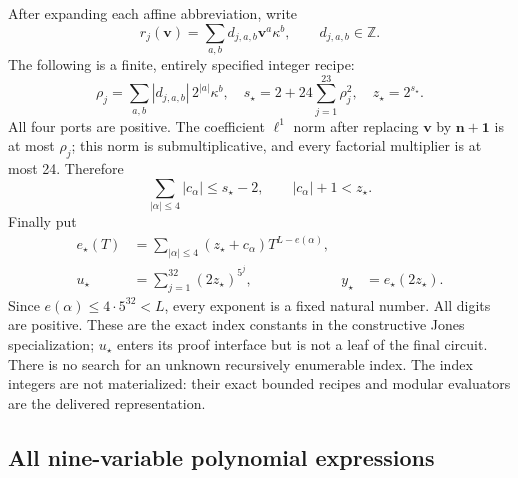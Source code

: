 After expanding each affine abbreviation, write
\[
 r_j(\mathbf v)=\sum_{a,b}d_{j,a,b}\mathbf v^a\kappa^b,
 \qquad d_{j,a,b}\in\mathbb Z.
\]
The following is a finite, entirely specified integer recipe:
\[
 \rho_j=\sum_{a,b}|d_{j,a,b}|\,2^{|a|}\kappa^b,
 \quad s_\star=2+24\sum_{j=1}^{23}\rho_j^2,
 \quad z_\star=2^{s_\star}.
\]
All four ports are positive. The coefficient $\ell^1$ norm after replacing
$\mathbf v$ by $\mathbf n+\mathbf1$ is at most $\rho_j$; this norm is
submultiplicative, and every factorial multiplier is at most 24. Therefore
\[
 \sum_{|\alpha|\le4}|c_\alpha|\le s_\star-2,
 \qquad |c_\alpha|+1<z_\star.
\]
Finally put
\begin{align*}
 e_\star(T)&=\sum_{|\alpha|\le4}(z_\star+c_\alpha)T^{L-e(\alpha)},\\
 u_\star&=\sum_{j=1}^{32}(2z_\star)^{5^j},
 &y_\star&=e_\star(2z_\star).
\end{align*}
Since $e(\alpha)\le4\cdot5^{32}<L$, every exponent is a fixed natural
number. All digits are positive. These are the exact index constants in
the constructive Jones specialization; $u_\star$ enters its proof
interface but is not a leaf of the final circuit. There is no search for
an unknown recursively enumerable index. The index integers are not
materialized: their exact bounded recipes and modular evaluators are the
delivered representation.

\subsection{All nine-variable polynomial expressions}


